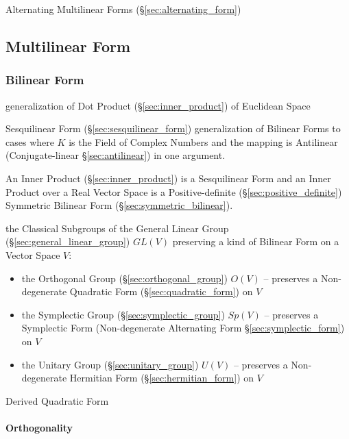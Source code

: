 Alternating Multilinear Forms (\S\ref{sec:alternating_form})



\subsection{Multilinear Form}\label{sec:multilinear_form}

\subsubsection{Bilinear Form}\label{sec:bilinear_form}

generalization of Dot Product (\S\ref{sec:inner_product}) of Euclidean Space

Sesquilinear Form (\S\ref{sec:sesquilinear_form}) generalization of Bilinear
Forms to cases where $K$ is the Field of Complex Numbers and the mapping is
Antilinear (Conjugate-linear \S\ref{sec:antilinear}) in one argument.

An Inner Product (\S\ref{sec:inner_product}) is a Sesquilinear Form and an
Inner Product over a Real Vector Space is a Positive-definite
(\S\ref{sec:positive_definite}) Symmetric Bilinear Form
(\S\ref{sec:symmetric_bilinear}).

the Classical Subgroups of the General Linear Group
(\S\ref{sec:general_linear_group}) $GL(V)$ preserving a kind of Bilinear Form
on a Vector Space $V$:
\begin{itemize}
  \item the Orthogonal Group (\S\ref{sec:orthogonal_group}) $O(V)$ -- preserves
    a Non-degenerate Quadratic Form (\S\ref{sec:quadratic_form}) on $V$
  \item the Symplectic Group (\S\ref{sec:symplectic_group}) $Sp(V)$
    -- preserves a Symplectic Form (Non-degenerate Alternating Form
    \S\ref{sec:symplectic_form}) on $V$
  \item the Unitary Group (\S\ref{sec:unitary_group}) $U(V)$
    -- preserves a Non-degenerate Hermitian Form (\S\ref{sec:hermitian_form})
    on $V$
\end{itemize}

Derived Quadratic Form



\paragraph{Orthogonality}\label{sec:orthogonality}\hfill

